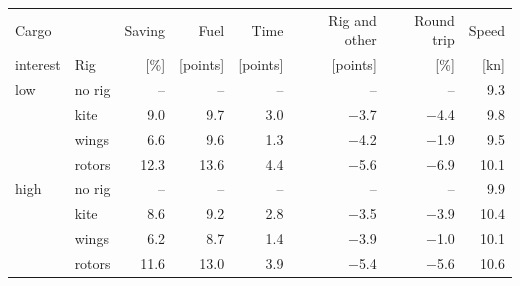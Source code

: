 \begin{tabular}{@{}llrrrrrr@{}}
\toprule
Cargo & & Saving & Fuel & Time & Rig and other & Round trip & Speed \\
interest & Rig & [\%] & [points] & [points] & [points] & [\%] & [kn] \\
\midrule
low & no rig & -- & -- & -- & -- & -- & 9.3 \\
 & kite & \cellcolor{gain!29}9.0 & \cellcolor{gain!29}9.7 & \cellcolor{gain!27}3.0 & \cellcolor{loss!26}$-$3.7 & \cellcolor{gain!26}$-$4.4 & 9.8 \\
 & wings & \cellcolor{gain!22}6.6 & \cellcolor{gain!28}9.6 & \cellcolor{gain!12}1.3 & \cellcolor{loss!30}$-$4.2 & \cellcolor{gain!11}$-$1.9 & 9.5 \\
 & rotors & \cellcolor{gain!40}12.3 & \cellcolor{gain!40}13.6 & \cellcolor{gain!40}4.4 & \cellcolor{loss!40}$-$5.6 & \cellcolor{gain!40}$-$6.9 & 10.1 \\
high & no rig & -- & -- & -- & -- & -- & 9.9 \\
 & kite & \cellcolor{gain!28}8.6 & \cellcolor{gain!27}9.2 & \cellcolor{gain!26}2.8 & \cellcolor{loss!25}$-$3.5 & \cellcolor{gain!23}$-$3.9 & 10.4 \\
 & wings & \cellcolor{gain!20}6.2 & \cellcolor{gain!25}8.7 & \cellcolor{gain!13}1.4 & \cellcolor{loss!28}$-$3.9 & \cellcolor{gain!6}$-$1.0 & 10.1 \\
 & rotors & \cellcolor{gain!38}11.6 & \cellcolor{gain!38}13.0 & \cellcolor{gain!36}3.9 & \cellcolor{loss!38}$-$5.4 & \cellcolor{gain!33}$-$5.6 & 10.6 \\
\bottomrule
\end{tabular}
